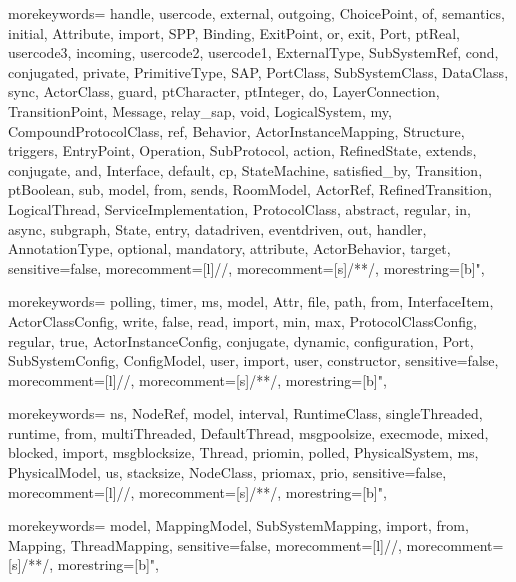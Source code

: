 


{morekeywords={
	handle,
	usercode,
	external,
	outgoing,
	ChoicePoint,
	of,
	semantics,
	initial,
	Attribute,
	import,
	SPP,
	Binding,
	ExitPoint,
	or,
	exit,
	Port,
	ptReal,
	usercode3,
	incoming,
	usercode2,
	usercode1,
	ExternalType,
	SubSystemRef,
	cond,
	conjugated,
	private,
	PrimitiveType,
	SAP,
	PortClass,
	SubSystemClass,
	DataClass,
	sync,
	ActorClass,
	guard,
	ptCharacter,
	ptInteger,
	do,
	LayerConnection,
	TransitionPoint,
	Message,
	relay_sap,
	void,
	LogicalSystem,
	my,
	CompoundProtocolClass,
	ref,
	Behavior,
	ActorInstanceMapping,
	Structure,
	triggers,
	EntryPoint,
	Operation,
	SubProtocol,
	action,
	RefinedState,
	extends,
	conjugate,
	and,
	Interface,
	default,
	cp,
	StateMachine,
	satisfied_by,
	Transition,
	ptBoolean,
	sub,
	model,
	from,
	sends,
	RoomModel,
	ActorRef,
	RefinedTransition,
	LogicalThread,
	ServiceImplementation,
	ProtocolClass,
	abstract,
	regular,
	in,
	async,
	subgraph,
	State,
	entry,
	datadriven,
	eventdriven,
	out,
	handler,
	AnnotationType,
	optional,
	mandatory,
	attribute,
	ActorBehavior,
	target,
}
sensitive=false,
morecomment=[l]{//},
morecomment=[s]{/*}{*/},
morestring=[b]",
} 


{morekeywords={
	polling,
	timer,
	ms,
	model,
	Attr,
	file,
	path,
	from,
	InterfaceItem,
	ActorClassConfig,
	write,
	false,
	read,
	import,
	min,
	max,
	ProtocolClassConfig,
	regular,
	true,
	ActorInstanceConfig,
	conjugate,
	dynamic,
	configuration,
	Port,
	SubSystemConfig,
	ConfigModel,
	user,
	import,
	user,
	constructor,
}
sensitive=false,
morecomment=[l]{//},
morecomment=[s]{/*}{*/},
morestring=[b]",
} 

{morekeywords={
	ns,
	NodeRef,
	model,
	interval,
	RuntimeClass,
	singleThreaded,
	runtime,
	from,
	multiThreaded,
	DefaultThread,
	msgpoolsize,
	execmode,
	mixed,
	blocked,
	import,
	msgblocksize,
	Thread,
	priomin,
	polled,
	PhysicalSystem,
	ms,
	PhysicalModel,
	us,
	stacksize,
	NodeClass,
	priomax,
	prio,
}
sensitive=false,
morecomment=[l]{//},
morecomment=[s]{/*}{*/},
morestring=[b]",
} 

{morekeywords={
	model,
	MappingModel,
	SubSystemMapping,
	import,
	from,
	Mapping,
	ThreadMapping,
}
sensitive=false,
morecomment=[l]{//},
morecomment=[s]{/*}{*/},
morestring=[b]",
} 
